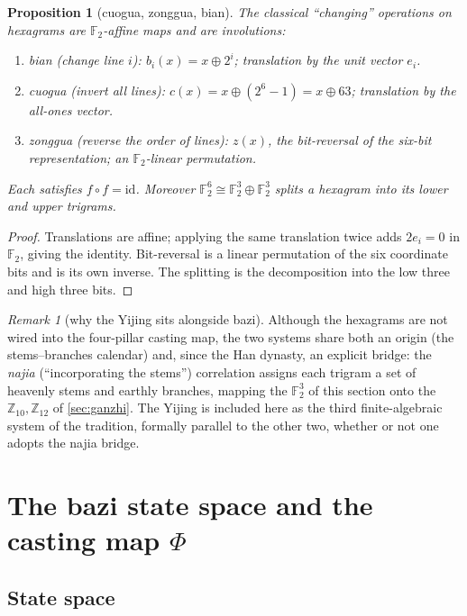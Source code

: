 \documentclass[11pt,a4paper]{article}
\newtheorem{proposition}[theorem]{Proposition}
\theoremstyle{definition}
\theoremstyle{remark}
\newtheorem*{remark}{Remark}
\newcommand{\Z}{\mathbb{Z}}
\newcommand{\F}{\mathbb{F}}
\begin{document}
\begin{proposition}[cuogua, zonggua, bian]\label{prop:yijing}
The classical ``changing'' operations on hexagrams are $\F_2$-affine maps and are involutions:
\begin{enumerate}[leftmargin=*]
  \item \emph{bian} (change line $i$): $b_i(x)=x\oplus 2^i$; translation by the unit vector $e_i$.
  \item \emph{cuogua} (invert all lines): $c(x)=x\oplus(2^6-1)=x\oplus 63$; translation by the all-ones vector.
  \item \emph{zonggua} (reverse the order of lines): $z(x)$, the bit-reversal of the six-bit representation; an $\F_2$-linear permutation.
\end{enumerate}
Each satisfies $f\circ f=\mathrm{id}$. Moreover $\F_2^6\cong\F_2^3\oplus\F_2^3$ splits a hexagram into its lower and upper trigrams.
\end{proposition}
\begin{proof}
Translations are affine; applying the same translation twice adds $2e_i=0$ in $\F_2$, giving the identity. Bit-reversal is a linear permutation of the six coordinate bits and is its own inverse. The splitting is the decomposition into the low three and high three bits.
\end{proof}

\begin{remark}[why the Yijing sits alongside bazi]\label{rem:najia}
Although the hexagrams are not wired into the four-pillar casting map, the two systems share both an origin (the stems--branches calendar) and, since the Han dynasty, an explicit bridge: the \emph{najia} (``incorporating the stems'') correlation assigns each trigram a set of heavenly stems and earthly branches, mapping the $\F_2^3$ of this section onto the $\Z_{10},\Z_{12}$ of \cref{sec:ganzhi}. The Yijing is included here as the third finite-algebraic system of the tradition, formally parallel to the other two, whether or not one adopts the najia bridge.
\end{remark}

\section{The bazi state space and the casting map \texorpdfstring{$\Phi$}{Phi}}\label{sec:bazi}

\subsection{State space}
\end{document}
